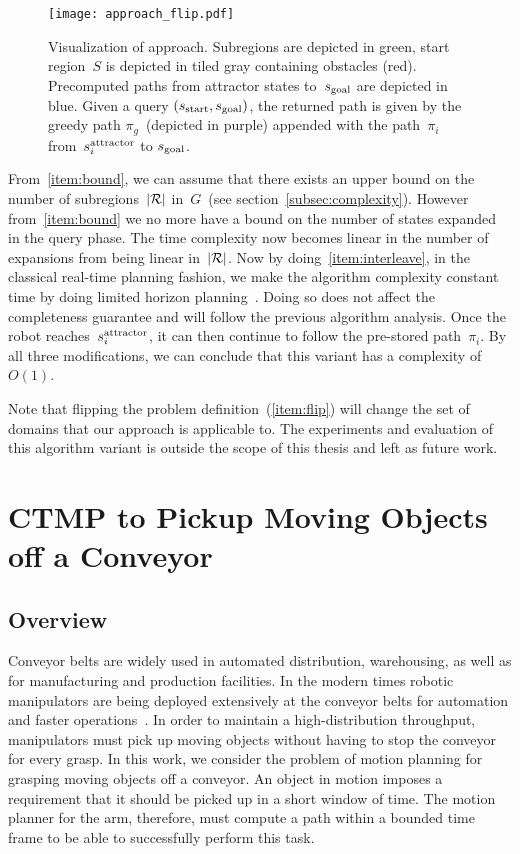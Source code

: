 \documentclass[a4paper,10pt]{article}
\begin{document}
\begin{figure}
\centering
\texttt{[image: approach\_flip.pdf]}
  \caption{
  Visualization of approach. Subregions are depicted in green, 
  start region~$S$ is depicted in tiled gray  containing obstacles (red).
  Precomputed paths from attractor states to~$s_{\text{goal}}$ are depicted in blue.
 Given a query $(s_{\rm{start}}, s_{\rm{goal}})$, the returned path is given by the greedy path $\pi_g$~(depicted in purple) appended with the path~$\pi_i$ from~$s^{\text{attractor}}_i$ to $s_{\text{goal}}$.
}
    \label{fig:approach_flip}
\end{figure}

From~\ref{item:bound}, we can assume that there exists an upper bound on the number of subregions~$|\mathcal{R}|$ in~$G$~(see section~\ref{subsec:complexity}). However from~\ref{item:bound} we no more have a bound on the number of states expanded in the query phase. The time complexity now becomes linear in the number of expansions from being linear in~$|\mathcal{R}|$. Now by doing~\ref{item:interleave}, in the classical real-time planning fashion, we make the algorithm complexity constant time by doing limited horizon planning~\cite{KL06,KS09,K90}. Doing so does not affect the completeness guarantee and will follow the previous algorithm analysis. Once the robot reaches~$s^{\text{attractor}}_i$, it can then continue to follow the pre-stored path~$\pi_i$. By all three modifications, we can conclude that this variant has a complexity of~$O(1)$.

Note that flipping the problem definition~(\ref{item:flip}) will change the set of domains that our approach is applicable to. The experiments and evaluation of this algorithm variant is outside the scope of this thesis and left as future work.

\newpage
\section{CTMP to Pickup Moving Objects off a Conveyor}
\label{sec:conveyor}
\subsection{Overview}
Conveyor belts are widely used in automated distribution, warehousing, as well as for manufacturing and production facilities. In the modern times robotic manipulators are being deployed extensively at the conveyor belts for automation and faster operations~\cite{zhang2018gilbreth}. In order to maintain a high-distribution throughput, manipulators must pick up moving objects without having to stop the conveyor for every grasp. In this work, we consider the problem of motion planning for grasping moving objects off a conveyor. An object in motion imposes a requirement that it should be picked up in a short window of time. The motion planner for the arm, therefore, must compute a path within a bounded time frame to be able to successfully perform this task.
\end{document}
